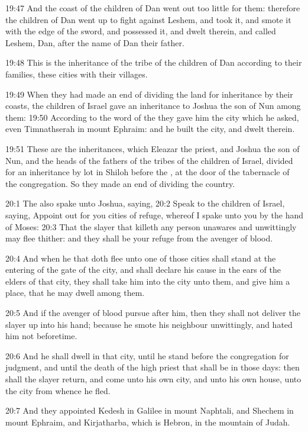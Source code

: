 19:47 And the coast of the children of Dan went out too little for
them: therefore the children of Dan went up to fight against Leshem,
and took it, and smote it with the edge of the sword, and possessed
it, and dwelt therein, and called Leshem, Dan, after the name of Dan
their father.

19:48 This is the inheritance of the tribe of the children of Dan
according to their families, these cities with their villages.

19:49 When they had made an end of dividing the land for inheritance
by their coasts, the children of Israel gave an inheritance to Joshua
the son of Nun among them: 19:50 According to the word of the \LORD
they gave him the city which he asked, even Timnathserah in mount
Ephraim: and he built the city, and dwelt therein.

19:51 These are the inheritances, which Eleazar the priest, and Joshua
the son of Nun, and the heads of the fathers of the tribes of the
children of Israel, divided for an inheritance by lot in Shiloh before
the \LORD, at the door of the tabernacle of the congregation. So they
made an end of dividing the country.

20:1 The \LORD also spake unto Joshua, saying, 20:2 Speak to the
children of Israel, saying, Appoint out for you cities of refuge,
whereof I spake unto you by the hand of Moses: 20:3 That the slayer
that killeth any person unawares and unwittingly may flee thither: and
they shall be your refuge from the avenger of blood.

20:4 And when he that doth flee unto one of those cities shall stand
at the entering of the gate of the city, and shall declare his cause
in the ears of the elders of that city, they shall take him into the
city unto them, and give him a place, that he may dwell among them.

20:5 And if the avenger of blood pursue after him, then they shall not
deliver the slayer up into his hand; because he smote his neighbour
unwittingly, and hated him not beforetime.

20:6 And he shall dwell in that city, until he stand before the
congregation for judgment, and until the death of the high priest that
shall be in those days: then shall the slayer return, and come unto
his own city, and unto his own house, unto the city from whence he
fled.

20:7 And they appointed Kedesh in Galilee in mount Naphtali, and
Shechem in mount Ephraim, and Kirjatharba, which is Hebron, in the
mountain of Judah.

